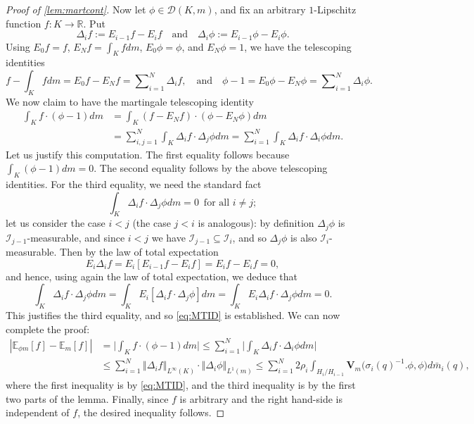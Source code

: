 \documentclass[10pt,a4paper]{amsart}
\begin{document}
\begin{proof}[Proof of \cref{lem:martcont}]
Now let \(\phi\in\mathcal{D}\left(K,m\right)\), and fix an arbitrary \(1\)-Lipschitz function \(f:K\to\mathbb{R}\). Put
\[\Delta_{i}f:=E_{i-1}f-E_{i}f\quad\text{and}\quad\Delta_{i}\phi:=E_{i-1}\phi-E_{i}\phi.\]
Using \(E_{0}f=f\), \(E_{N}f=\int_{K}fdm\), \(E_{0}\phi=\phi\), and \(E_{N}\phi=1\), we have the telescoping identities
\[f-\int_{K}fdm=E_{0}f-E_{N}f=\sum\nolimits_{i=1}^{N}\Delta_{i}f,\quad\text{and}\quad\phi-1=E_{0}\phi-E_{N}\phi=\sum\nolimits_{i=1}^{N}\Delta_{i}\phi.\]
We now claim to have the martingale telescoping identity
\begin{equation}
\begin{aligned}
\int_{K}f\cdot\left(\phi-1\right)dm
&=\int_{K}\left(f-E_{N}f\right)\cdot\left(\phi-E_{N}\phi\right)dm\\
&=\sum\nolimits_{i,j=1}^{N}\int_{K}\Delta_{i}f\cdot\Delta_{j}\phi dm=\sum\nolimits_{i=1}^{N}\int_{K}\Delta_{i}f\cdot\Delta_{i}\phi dm.
\end{aligned}\label{eq:MTID}
\end{equation}
Let us justify this computation. The first equality follows because \(\int_{K}\left(\phi-1\right)dm=0\). The second equality follows by the above telescoping identities. For the third equality, we need the standard fact
\[\int_{K}\Delta_{i}f\cdot\Delta_{j}\phi dm=0\,\text{ for all }i\neq j;\]
let us consider the case \(i<j\) (the case \(j<i\) is analogous): by definition \(\Delta_{j}\phi\) is \(\mathcal{I}_{j-1}\)-measurable, and since \(i<j\) we have \(\mathcal{I}_{j-1}\subseteq\mathcal{I}_{i}\), and so \(\Delta_{j}\phi\) is also \(\mathcal{I}_{i}\)-measurable. Then by the law of total expectation
\[E_{i}\Delta_{i}f=E_{i}\left[E_{i-1}f-E_{i}f\right]=E_{i}f-E_{i}f=0,\]
and hence, using again the law of total expectation, we deduce that
\[\int_{K}\Delta_{i}f\cdot\Delta_{j}\phi dm=\int_{K}E_{i}\left[\Delta_{i}f\cdot\Delta_{j}\phi\right]dm=\int_{K}E_{i}\Delta_{i}f\cdot\Delta_{j}\phi dm=0.\]
This justifies the third equality, and so \eqref{eq:MTID} is established. We can now complete the proof:
\begin{align*}
\left|\mathbb{E}_{\phi m}\left[f\right]-\mathbb{E}_{m}\left[f\right]\right|	
&=\Big|\int_{K}f\cdot\left(\phi-1\right)dm\Big|\leq\sum\nolimits_{i=1}^{N}\Big|\int_{K}\Delta_{i}f\cdot\Delta_{i}\phi dm\Big|\\
&\leq\sum\nolimits_{i=1}^{N}\left\Vert\Delta_{i}f\right\Vert_{L^{\infty}\left(K\right)}\cdot\left\Vert\Delta_{i}\phi\right\Vert_{L^{1}\left(m\right)}\leq\sum\nolimits_{i=1}^{N}2\rho_{i}\int_{H_{i}/H_{i-1}}\mathbf{V}_{m}\big(\sigma_{i}\left(q\right)^{-1}.\phi,\phi\big)d\bar{m}_{i}\left(q\right),
\end{align*}
where the first inequality is by \eqref{eq:MTID}, and the third inequality is by the first two parts of the lemma. Finally, since \(f\) is arbitrary and the right hand-side is independent of \(f\), the desired inequality follows.
\end{proof}
\end{document}
